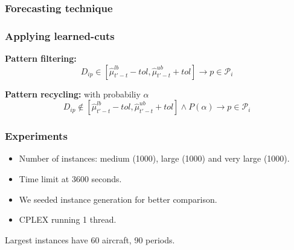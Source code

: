 \begin{frame}
\frametitle{\textbf{Forecasting technique}}


\end{frame}

\begin{frame}
\frametitle{\textbf{Applying learned-cuts}}

  \begin{block}{\textbf{Pattern filtering:}}
    \begin{equation*}
      D_{ip} \in [\hat{\mu}_{t'-t}^{lb} - tol, \hat{\mu}_{t'-t}^{ub} + tol] \rightarrow p \in \mathcal{P}_i 
    \end{equation*}
  \end{block}
  \pause

  \begin{block}{\textbf{Pattern recycling:} with probabiliy $\alpha$}
    \begin{equation*}
      D_{ip} \notin [\hat{\mu}_{t'-t}^{lb} - tol, \hat{\mu}_{t'-t}^{ub} + tol] \land P(\alpha)  \rightarrow p \in \mathcal{P}_i 
    \end{equation*}
  \end{block}
\end{frame}

\begin{frame}
\frametitle{\textbf{Experiments}}
  \begin{itemize}

  \item Number of instances: medium (1000), large (1000) and very large
    (1000).
  \item Time limit at 3600 seconds.
  \item We seeded instance generation for better comparison.
  \item CPLEX running 1 thread.
  \end{itemize}

  Largest instances have 60 aircraft, 90 periods.
\end{frame}

